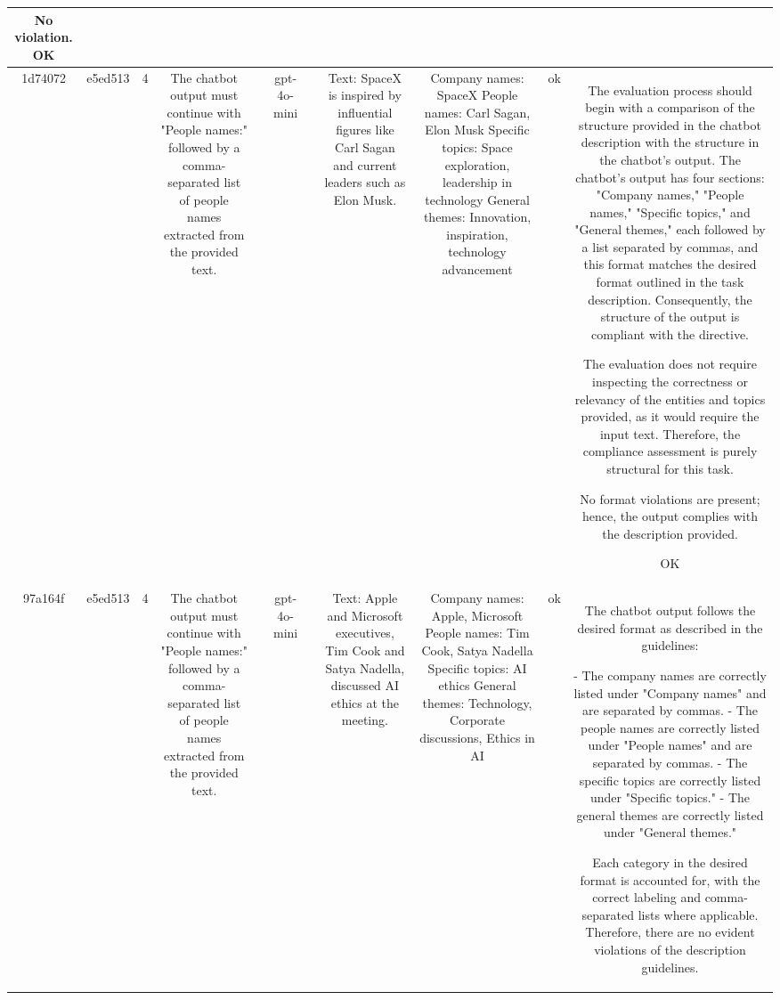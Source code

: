 \begin{table}[h!]
\begin{tabular}{|c|c|c|c|c|c|c|c|c|c|c|}
No violation.
OK\\
\hline
1d74072 & e5ed513 & 4 & The chatbot output must continue with "People names:" followed by a comma-separated list of people names extracted from the provided text. &  & gpt-4o-mini &  & Text: SpaceX is inspired by influential figures like Carl Sagan and current leaders such as Elon Musk. & Company names: SpaceX
People names: Carl Sagan, Elon Musk
Specific topics: Space exploration, leadership in technology
General themes: Innovation, inspiration, technology advancement & ok & The evaluation process should begin with a comparison of the structure provided in the chatbot description with the structure in the chatbot's output. The chatbot's output has four sections: "Company names," "People names," "Specific topics," and "General themes," each followed by a list separated by commas, and this format matches the desired format outlined in the task description. Consequently, the structure of the output is compliant with the directive.

The evaluation does not require inspecting the correctness or relevancy of the entities and topics provided, as it would require the input text. Therefore, the compliance assessment is purely structural for this task.

No format violations are present; hence, the output complies with the description provided.

OK\\
\hline
97a164f & e5ed513 & 4 & The chatbot output must continue with "People names:" followed by a comma-separated list of people names extracted from the provided text. &  & gpt-4o-mini &  & Text: Apple and Microsoft executives, Tim Cook and Satya Nadella, discussed AI ethics at the meeting. & Company names: Apple, Microsoft
People names: Tim Cook, Satya Nadella
Specific topics: AI ethics
General themes: Technology, Corporate discussions, Ethics in AI & ok & The chatbot output follows the desired format as described in the guidelines:

- The company names are correctly listed under "Company names" and are separated by commas.
- The people names are correctly listed under "People names" and are separated by commas.
- The specific topics are correctly listed under "Specific topics."
- The general themes are correctly listed under "General themes."

Each category in the desired format is accounted for, with the correct labeling and comma-separated lists where applicable. Therefore, there are no evident violations of the description guidelines.


\end{tabular}
\end{table}
